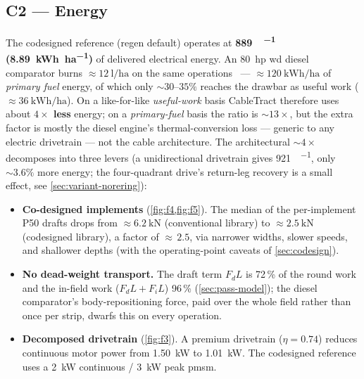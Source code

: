 \documentclass[11pt,a4paper]{article}
\begin{document}
\subsection{C2 --- Energy}\label{sec:r-c2}

The codesigned reference (regen default) operates at \textbf{\SI{889}{\Wh\per\decare} (\SI{8.89}{\kWh\per\hectare})} of delivered electrical energy. An \SI{80}{hp} \gls{wd} diesel comparator burns ${\approx}\SI{12}{\litre\per\hectare}$ on the same operations~\cite{asabe-d497,siemens1999machinery} --- ${\approx}\SI{120}{\kWh\per\hectare}$ of \emph{primary fuel} energy, of which only ${\sim}30\text{--}35\%$ reaches the drawbar as useful work (${\approx}\SI{36}{\kWh\per\hectare}$). On a like-for-like \emph{useful-work} basis CableTract therefore uses about \textbf{$4\times$ less} energy; on a \emph{primary-fuel} basis the ratio is ${\sim}13\times$, but the extra factor is mostly the diesel engine's thermal-conversion loss --- generic to any electric drivetrain --- not the cable architecture. The architectural ${\sim}4\times$ decomposes into three levers (a unidirectional drivetrain gives \SI{921}{\Wh\per\decare}, only ${\sim}3.6\%$ more energy; the four-quadrant drive's return-leg recovery is a small effect, see \cref{sec:variant-norering}):

\begin{itemize}[leftmargin=1.6em,itemsep=0.1em]
    \item \textbf{Co-designed implements} (\cref{fig:f4,fig:f5}). The median of the per-implement P50 drafts drops from ${\approx}\SI{6.2}{\kilo\newton}$ (conventional library) to ${\approx}\SI{2.5}{\kilo\newton}$ (codesigned library), a factor of ${\approx}\,2.5$, via narrower widths, slower speeds, and shallower depths (with the operating-point caveats of \cref{sec:codesign}).
    \item \textbf{No dead-weight transport.} The draft term $F_d L$ is 72\,\% of the round work and the in-field work ($F_d L + F_i L$) 96\,\% (\cref{sec:pass-model}); the diesel comparator's body-repositioning force, paid over the whole field rather than once per strip, dwarfs this on every operation.
    \item \textbf{Decomposed drivetrain} (\cref{fig:f3}). A premium drivetrain ($\eta = 0.74$) reduces continuous motor power from \SI{1.50}{\kilo\watt} to \SI{1.01}{\kilo\watt}. The codesigned reference uses a \SI{2}{\kilo\watt} continuous / \SI{3}{\kilo\watt} peak \gls{pmsm}.
\end{itemize}
\end{document}
